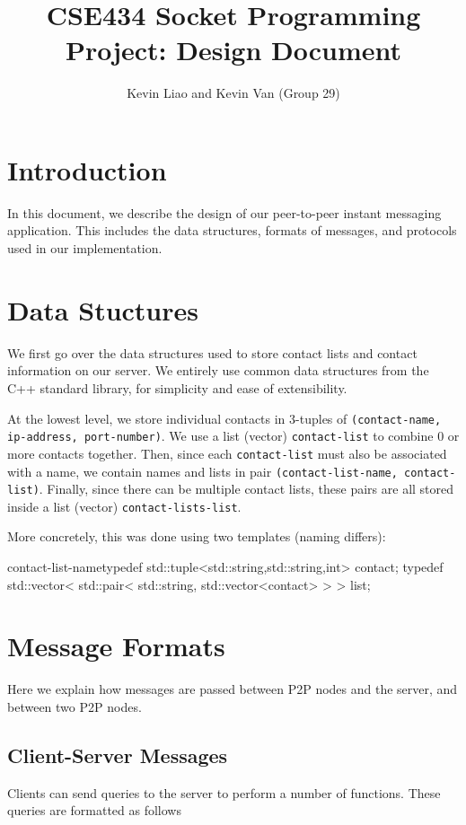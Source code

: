 \documentclass[letterpaper]{article}
\title{CSE434 Socket Programming Project: Design Document}
\author{Kevin Liao and Kevin Van (Group 29)}
\newenvironment{CVerbatim}
 {\singlespacing\center\BVerbatim}
 {\endBVerbatim\endcenter}
\begin{document}
\maketitle

\section{Introduction}

In this document, we describe the design of our peer-to-peer instant messaging application. This includes the data structures, formats of messages, and protocols used in our implementation.

\section{Data Stuctures}

We first go over the data structures used to store contact lists and contact information on our server. We entirely use common data structures from the C++ standard library, for simplicity and ease of extensibility.

At the lowest level, we store individual contacts in 3-tuples of {\tt (contact-name, ip-address, port-number)}. We use a list (vector) {\tt contact-list} to combine 0 or more  contacts together. Then, since each {\tt contact-list} must also be associated with a name, we contain names and lists in pair {\tt (contact-list-name, contact-list)}. Finally, since there can be multiple contact lists, these pairs are all stored inside a list (vector) {\tt contact-lists-list}.

More concretely, this was done using two templates (naming differs):

contact-list-name\begin{CVerbatim}[fontsize=\small]
typedef std::tuple<std::string,std::string,int> contact;
typedef std::vector< std::pair< std::string,
    std::vector<contact> > > list;
\end{CVerbatim}

\section{Message Formats}
Here we explain how messages are passed between P2P nodes and the server, and between two P2P nodes.

\subsection{Client-Server Messages}
Clients can send queries to the server to perform a number of functions. These queries are formatted as follows
\end{document}
